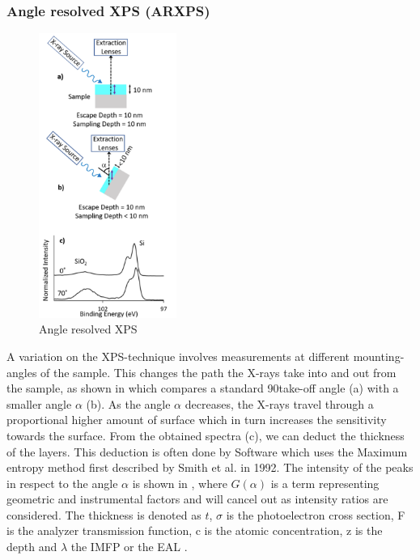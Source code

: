 \subsubsection{Angle resolved XPS (ARXPS)}
\begin{figure}
    \centering
    \includegraphics[width=0.4\textwidth]{Figures/ARXPS.png}
    \caption{Angle resolved XPS \cite{stevie_introduction_2020}}
    \label{fig:arxps}
\end{figure}
A variation on the XPS-technique involves measurements at different mounting-angles of the sample.
This changes the path the X-rays take into and out from the sample, as shown in  which compares a standard 90\textdegree  take-off angle (a) with a smaller angle $\alpha$ (b). As the angle $\alpha$ decreases, the X-rays travel through a proportional higher amount of surface which in turn increases the sensitivity towards the surface. From the obtained spectra (c), we can deduct the thickness of the layers. This deduction is often done by Software which uses the Maximum entropy method first described by Smith et al. \cite{smith_maximum_1992} in 1992.
The intensity of the peaks in respect to the angle $\alpha$ is shown in , where $G(\alpha)$ is a term representing geometric and instrumental factors and will cancel out as intensity ratios are considered. 
The thickness is denoted as $t$,
$\sigma$ is the photoelectron cross section,
F is the analyzer transmission function,
c is the atomic concentration,
z is the depth and $\lambda$ the IMFP or the EAL
\cite{paynter_arxps_2009}.

